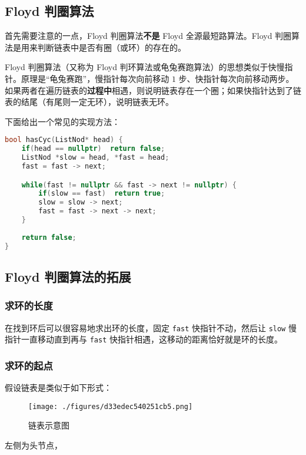 
\subsection{Floyd 判圈算法}
首先需要注意的一点，Floyd 判圈算法\textbf{不是} Floyd 全源最短路算法。Floyd 判圈算法是用来判断链表中是否有圈（或环）的存在的。

Floyd 判圈算法（又称为 Floyd 判环算法或龟兔赛跑算法）的思想类似于快慢指针。原理是“龟兔赛跑”，慢指针每次向前移动 $1$ 步、快指针每次向前移动两步。如果两者在遍历链表的\textbf{过程中}相遇，则说明链表存在一个圈；如果快指针达到了链表的结尾（有尾则一定无环），说明链表无环。

下面给出一个常见的实现方法：
\begin{lstlisting}[language=cpp]
bool hasCyc(ListNod* head) {
    if(head == nullptr)  return false;
    ListNod *slow = head, *fast = head;
    fast = fast -> next;

    while(fast != nullptr && fast -> next != nullptr) {
        if(slow == fast)  return true;
        slow = slow -> next;
        fast = fast -> next -> next;
    }
    
    return false;
}
\end{lstlisting}

\subsection{Floyd 判圈算法的拓展}
\subsubsection{求环的长度}
在找到环后可以很容易地求出环的长度，固定 \verb`fast` 快指针不动，然后让 \verb`slow` 慢指针一直移动直到再与 \verb`fast` 快指针相遇，这移动的距离恰好就是环的长度。
\subsubsection{求环的起点}
假设链表是类似于如下形式：
\begin{figure}[ht]
\centering
\texttt{[image: ./figures/d33edec540251cb5.png]}
\caption{链表示意图} \label{fig_FloydC_2}
\end{figure}左侧为头节点，